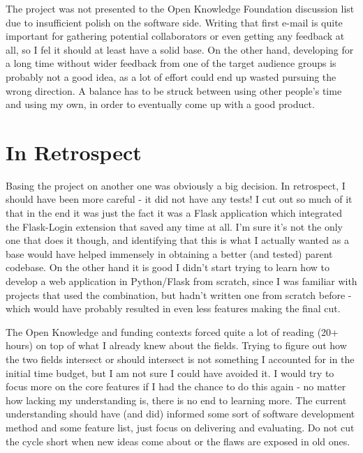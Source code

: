 The project was not presented to the Open Knowledge Foundation discussion list due to insufficient polish on the software side. Writing that first e-mail is quite important for gathering potential collaborators or even getting any feedback at all, so I fel it should at least have a solid base. On the other hand, developing for a long time without wider feedback from one of the target audience groups is probably not a good idea, as a lot of effort could end up wasted pursuing the wrong direction. A balance has to be struck between using other people's time and using my own, in order to eventually come up with a good product.

\section{In Retrospect}

Basing the project on another one was obviously a big decision. In retrospect, I should have been more careful - it did not have any tests! I cut out so much of it that in the end it was just the fact it was a Flask application which integrated the Flask-Login extension that saved any time at all. I'm sure it's not the only one that does it though, and identifying that this is what I actually wanted as a base would have helped immensely in obtaining a better (and tested) parent codebase. On the other hand it is good I didn't start trying to learn how to develop a web application in Python/Flask from scratch, since I was familiar with projects that used the combination, but hadn't written one from scratch before - which would have probably resulted in even less features making the final cut.

The Open Knowledge and funding contexts forced quite a lot of reading (20+ hours) on top of what I already knew about the fields. Trying to figure out how the two fields intersect or should intersect is not something I accounted for in the initial time budget, but I am not sure I could have avoided it. I would try to focus more on the core features if I had the chance to do this again - no matter how lacking my understanding is, there is no end to learning more. The current understanding should have (and did) informed some sort of software development method and some feature list, just focus on delivering and evaluating. Do not cut the cycle short when new ideas come about or the flaws are exposed in old ones.

